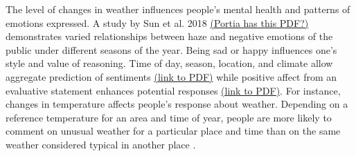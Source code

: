 \documentclass{article}
\begin{document}
The level of changes in weather influences people’s mental health and patterns of emotions expressed. A study by Sun et al. 2018 \href{file:///Users/portia/Downloads/ijerph-16-00086-v2 20(1).pdf.}{(Portia has this PDF?)} demonstrates varied relationships between haze and negative emotions of the public under different seasons of the year. Being sad or happy influences one's style and value of reasoning. Time of day, season, location, and climate allow aggregate prediction of sentiments \cite{hannak_tweetin_2012} \href{https://www.ccs.neu.edu/~amislove/publications/Weather-ICWSM.pdf}{(link to PDF)} while positive affect from an evaluative statement enhances potential responses \cite{clore_how_2007} \href{https://www.ncbi.nlm.nih.gov/pmc/articles/PMC2483304/pdf/nihms40349.pdf}{(link to PDF)}. For instance, changes in temperature affects people’s response about weather. Depending on a reference temperature for an  area and time of year, people are more likely to comment on unusual weather for a particular place and time than on the same weather considered typical in another place \cite{moore_rapidly_2019}.
\end{document}
